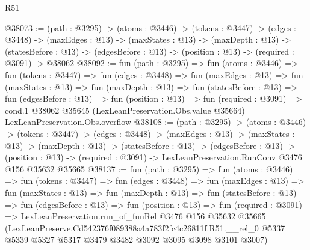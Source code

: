 \begin{lexlean}{R51}
\begin{coremodule}
@38073 := (path : @3295) ->
  (atoms : @3446) ->
  (tokens : @3447) ->
  (edges : @3448) ->
  (maxEdges : @13) ->
  (maxStates : @13) ->
  (maxDepth : @13) ->
  (statesBefore : @13) -> (edgesBefore : @13) -> (position : @13) -> (required : @3091) -> @38062
@38092 := fun (path : @3295) =>
  fun (atoms : @3446) =>
  fun (tokens : @3447) =>
  fun (edges : @3448) =>
  fun (maxEdges : @13) =>
  fun (maxStates : @13) =>
  fun (maxDepth : @13) =>
  fun (statesBefore : @13) =>
  fun (edgesBefore : @13) =>
  fun (position : @13) =>
  fun (required : @3091) =>
  cond.{1} @38062 @35645 (LexLeanPreservation.Obs.value @35664) LexLeanPreservation.Obs.overflow
@38108 := (path : @3295) ->
  (atoms : @3446) ->
  (tokens : @3447) ->
  (edges : @3448) ->
  (maxEdges : @13) ->
  (maxStates : @13) ->
  (maxDepth : @13) ->
  (statesBefore : @13) ->
  (edgesBefore : @13) ->
  (position : @13) -> (required : @3091) -> LexLeanPreservation.RunConv @3476 @156 @35632 @35665
@38137 := fun (path : @3295) =>
  fun (atoms : @3446) =>
  fun (tokens : @3447) =>
  fun (edges : @3448) =>
  fun (maxEdges : @13) =>
  fun (maxStates : @13) =>
  fun (maxDepth : @13) =>
  fun (statesBefore : @13) =>
  fun (edgesBefore : @13) =>
  fun (position : @13) =>
  fun (required : @3091) =>
  LexLeanPreservation.run_of_funRel
    @3476
    @156
    @35632
    @35665
    (LexLeanPreserve.Cd542376f089388a4a783f2fc4c26811f.R51.__rel_0
      @5337
      @5339
      @5327
      @5317
      @3479
      @3482
      @3092
      @3095
      @3098
      @3101
      @3007)
\end{coremodule}
\end{lexlean}
